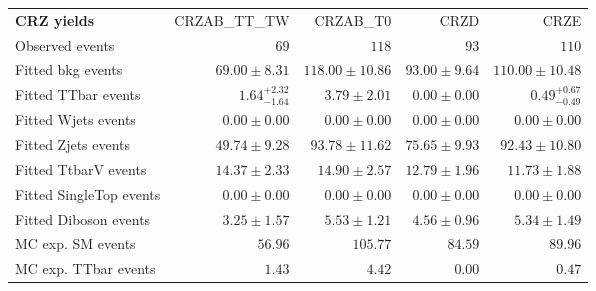 

\begin{table}
\begin{center}
\setlength{\tabcolsep}{0.0pc}
{\small
\begin{tabular*}{\textwidth}{@{\extracolsep{\fill}}lrrrr}
\noalign{\smallskip}\hline\noalign{\smallskip}
{\bf CRZ yields}           & CRZAB\_TT\_TW            & CRZAB\_T0            & CRZD            & CRZE              \\[-0.05cm]
\noalign{\smallskip}\hline\noalign{\smallskip}
Observed events          & $69$              & $118$              & $93$              & $110$                    \\
\noalign{\smallskip}\hline\noalign{\smallskip}
Fitted bkg events         & $69.00 \pm 8.31$          & $118.00 \pm 10.86$          & $93.00 \pm 9.64$          & $110.00 \pm 10.48$              \\
\noalign{\smallskip}\hline\noalign{\smallskip}
        Fitted TTbar events         & $1.64_{-1.64}^{+2.32}$          & $3.79 \pm 2.01$          & $0.00 \pm 0.00$          & $0.49_{-0.49}^{+0.67}$              \\
        Fitted Wjets events         & $0.00 \pm 0.00$          & $0.00 \pm 0.00$          & $0.00 \pm 0.00$          & $0.00 \pm 0.00$              \\
        Fitted Zjets events         & $49.74 \pm 9.28$          & $93.78 \pm 11.62$          & $75.65 \pm 9.93$          & $92.43 \pm 10.80$              \\
        Fitted TtbarV events         & $14.37 \pm 2.33$          & $14.90 \pm 2.57$          & $12.79 \pm 1.96$          & $11.73 \pm 1.88$              \\
        Fitted SingleTop events         & $0.00 \pm 0.00$          & $0.00 \pm 0.00$          & $0.00 \pm 0.00$          & $0.00 \pm 0.00$              \\
        Fitted Diboson events         & $3.25 \pm 1.57$          & $5.53 \pm 1.21$          & $4.56 \pm 0.96$          & $5.34 \pm 1.49$              \\
 \noalign{\smallskip}\hline\noalign{\smallskip}
MC exp. SM events              & $56.96$          & $105.77$          & $84.59$          & $89.96$              \\
\noalign{\smallskip}\hline\noalign{\smallskip}
        MC exp. TTbar events         & $1.43$          & $4.42$          & $0.00$          & $0.47$              \\

\end{tabular*}}
\end{center}
\end{table}
